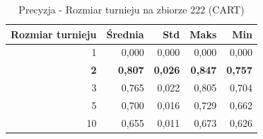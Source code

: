 \begin{table}[htbp]
\centering
\small
\setlength{\tabcolsep}{6pt}
\renewcommand{\arraystretch}{1.2}
\caption{Precyzja - Rozmiar turnieju na zbiorze 222 (CART)}
\label{tab:CART_tournament_size_222_precision}
\begin{tabular}{r|r|r|r|r}
\toprule
Rozmiar turnieju & Średnia & Std & Maks & Min \\
\hline
1 & 0,000 & 0,000 & 0,000 & 0,000 \\
\textbf{2} & \textbf{0,807} & \textbf{0,026} & \textbf{0,847} & \textbf{0,757} \\
3 & 0,765 & 0,022 & 0,805 & 0,704 \\
5 & 0,700 & 0,016 & 0,729 & 0,662 \\
10 & 0,655 & 0,011 & 0,673 & 0,626 \\
\bottomrule
\end{tabular}
\end{table}
